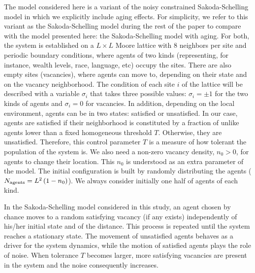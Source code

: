 The model considered here is a variant of the noisy constrained Sakoda-Schelling model \cite{Gauvin_2009} in which we explicitly include aging effects. For simplicity, we refer to this variant as the Sakoda-Schelling model during the rest of the paper to compare with the model presented here: the Sakoda-Schelling model with aging. For both, the system is established on a $L \times L$ Moore lattice with $8$ neighbors per site and periodic boundary conditions, where agents of two kinds (representing, for instance, wealth levels, race, language, etc) occupy the sites. There are also empty sites (vacancies), where agents can move to, depending on their state and on the vacancy neighborhood. The condition of each site $i$ of the lattice will be described with a variable  $\sigma_i$ that takes three possible values: $\sigma_i = \pm 1$ for the two kinds of agents and $\sigma_i = 0$ for vacancies. In addition, depending on the local environment, agents can be in two states: satisfied or unsatisfied. In our case, agents are satisfied if their neighborhood is constituted by a fraction of unlike agents lower than a fixed homogeneous threshold $T$. Otherwise, they are unsatisfied. Therefore, this control parameter $T$ is a measure of how tolerant the population of the system is. We also need a non-zero vacancy density, $n_0 > 0$, for agents to change their location. This $n_0$ is understood as an extra parameter of the model. The initial configuration is built by randomly distributing the agents ($N_{\rm agents} = L^2 \, (1 - n_0)$). We always consider initially one half of agents of each kind.

In the Sakoda-Schelling model considered in this study, an agent chosen by chance moves to a random satisfying vacancy (if any exists) independently of his/her initial state and of the distance. This process is repeated until the system reaches a stationary state. The movement of unsatisfied agents behaves as a driver for the system dynamics, while the motion of satisfied agents plays the role of noise. When tolerance $T$ becomes larger, more satisfying vacancies are present in the system and the noise consequently increases. 

